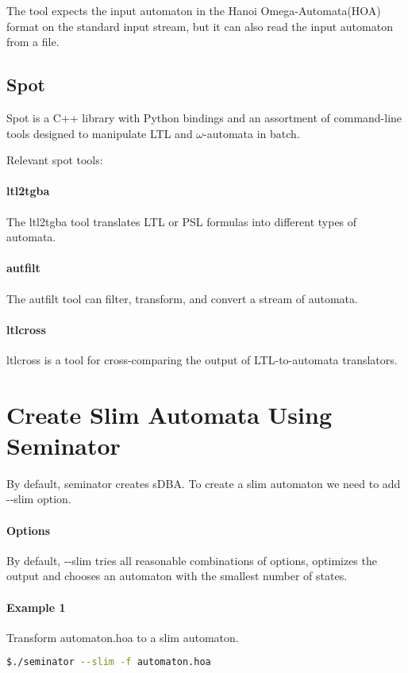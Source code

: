 \documentclass[
	digital
nolof, nolot
]{fithesis3}
\begin{document}
		
		
		The tool expects the input automaton in the Hanoi Omega-Automata(HOA) format \cite{DBLP:conf/cav/BabiakBDKKM0S15} on the standard input stream, but it can also read the input automaton from a file.
		
	\subsection{Spot}
	Spot is a C++ library with Python bindings and an assortment of command-line tools designed to manipulate LTL and $\omega$-automata in batch. \cite{spot2}
	
	Relevant spot tools:
	\paragraph{ltl2tgba} The ltl2tgba tool translates LTL or PSL formulas into different types of automata. \cite{ltl2tgba}
	\paragraph{autfilt} The autfilt tool can filter, transform, and convert a stream of automata. \cite{autfilt}
	\paragraph{ltlcross} ltlcross is a tool for cross-comparing the output of LTL-to-automata translators. \cite{ltlcross}
		\section{Create Slim Automata Using Seminator}
		By default, seminator creates sDBA. To create a slim automaton we need to add -{}-slim option. 
		\paragraph{Options} By default, -{}-slim tries all reasonable combinations of options, optimizes the output and chooses an automaton with the smallest number of states.
		
		\paragraph{Example 1}
		Transform automaton.hoa to a slim automaton.

		\begin{lstlisting}[language=bash]
$./seminator --slim -f automaton.hoa
		\end{lstlisting}
		
\end{document}
